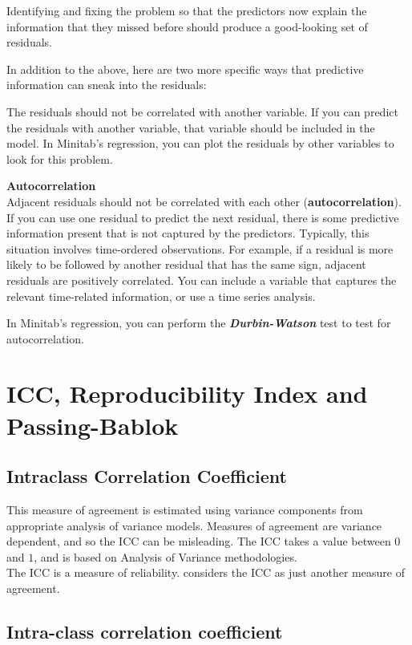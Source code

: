 \documentclass[12pt, a4paper]{report}
\theoremstyle{plain}
\theoremstyle{definition}
\theoremstyle{remark}
\begin{document}
	
	Identifying and fixing the problem so that the predictors now explain the information that they missed before should produce a good-looking set of residuals.
	
	In addition to the above, here are two more specific ways that predictive information can sneak into the residuals:
	
	The residuals should not be correlated with another variable. If you can predict the residuals with another variable, that variable should be included in the model. In Minitab’s regression, you can plot the residuals by other variables to look for this problem.
	
	\noindent \textbf{Autocorrelation} \\
	Adjacent residuals should not be correlated with each other (\textbf{autocorrelation}). If you can use one residual to predict the next residual, there is some predictive information present that is not captured by the predictors. Typically, this situation involves time-ordered observations. For example, if a residual is more likely to be followed by another residual that has the same sign, adjacent residuals are positively correlated. You can include a variable that captures the relevant time-related information, or use a time series analysis. 
	
	In Minitab’s regression, you can perform the \textbf{\textit{Durbin-Watson} }test to test for autocorrelation.
	

	\section{ICC, Reproducibility Index and Passing-Bablok }
	
	
	\subsection{Intraclass Correlation Coefficient} This measure of agreement is estimated using variance components from appropriate analysis of variance models. Measures of agreement are variance dependent, and so the ICC can be misleading. The ICC takes a value between $0$ and $1$, and is based on Analysis of Variance
	methodologies.
	\\
	The ICC is a measure of reliability. \citet{bartko} considers the ICC as just another measure of agreement.
	
	
	\subsection*{Intra-class correlation coefficient}
	
\end{document}
